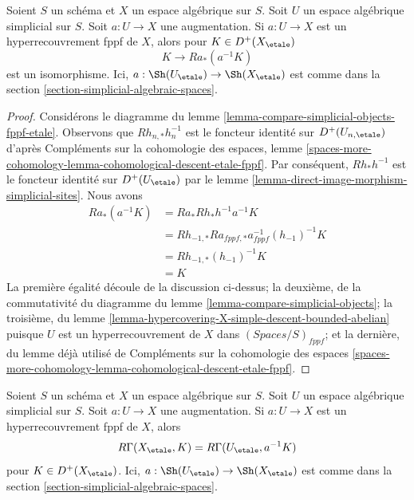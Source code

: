 \begin{lemma}
\label{lemma-cohomological-descent-for-fppf-hypercovering}
Soient $S$ un schéma et $X$ un espace algébrique sur $S$.
Soit $U$ un espace algébrique simplicial sur $S$. Soit $a : U \to X$
une augmentation. Si $a : U \to X$ est un hyperrecouvrement fppf de $X$,
alors pour $K \in D^+(X_\etale)$
$$
K \to Ra_*(a^{-1}K)
$$
est un isomorphisme. Ici, $a : \Sh(U_\etale) \to \Sh(X_\etale)$
est comme dans la section \ref{section-simplicial-algebraic-spaces}.
\end{lemma}

\begin{proof}
Considérons le diagramme du lemme \ref{lemma-compare-simplicial-objects-fppf-etale}.
Observons que $Rh_{n, *}h_n^{-1}$ est le foncteur identité
sur $D^+(U_{n, \etale})$ d'après
Compléments sur la cohomologie des espaces, lemme
\ref{spaces-more-cohomology-lemma-cohomological-descent-etale-fppf}.
Par conséquent, $Rh_*h^{-1}$ est le foncteur identité sur
$D^+(U_\etale)$ par
le lemme \ref{lemma-direct-image-morphism-simplicial-sites}.
Nous avons
\begin{align*}
Ra_*(a^{-1}K)
& =
Ra_*Rh_*h^{-1}a^{-1}K \\
& =
Rh_{-1, *}Ra_{fppf, *}a_{fppf}^{-1}(h_{-1})^{-1}K \\
& =
Rh_{-1, *}(h_{-1})^{-1}K \\
& =
K
\end{align*}
La première égalité découle de la discussion ci-dessus; la deuxième,
de la commutativité du diagramme du lemme
\ref{lemma-compare-simplicial-objects}; la troisième, du lemme
\ref{lemma-hypercovering-X-simple-descent-bounded-abelian}
puisque $U$ est un hyperrecouvrement de $X$ dans $(\textit{Spaces}/S)_{fppf}$;
et la dernière, du lemme déjà utilisé de
Compléments sur la cohomologie des espaces
\ref{spaces-more-cohomology-lemma-cohomological-descent-etale-fppf}.
\end{proof}

\begin{lemma}
\label{lemma-compute-via-fppf-hypercovering}
Soient $S$ un schéma et $X$ un espace algébrique sur $S$.
Soit $U$ un espace algébrique simplicial sur $S$. Soit $a : U \to X$
une augmentation. Si $a : U \to X$ est un hyperrecouvrement fppf de $X$, alors
$$
R\Gamma(X_\etale, K) = R\Gamma(U_\etale, a^{-1}K)
$$
pour $K \in D^+(X_\etale)$. Ici, $a : \Sh(U_\etale) \to \Sh(X_\etale)$
est comme dans la section \ref{section-simplicial-algebraic-spaces}.
\end{lemma}

